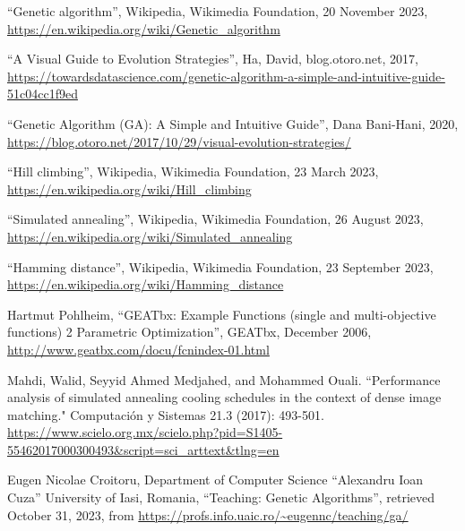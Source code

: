 \documentclass{article}
\begin{document}
\begin{thebibliography}{9}

``Genetic algorithm'', Wikipedia, Wikimedia Foundation, 20 November 2023, \url{https://en.wikipedia.org/wiki/Genetic_algorithm}

``A Visual Guide to Evolution Strategies'', Ha, David, blog.otoro.net, 2017, \url{https://towardsdatascience.com/genetic-algorithm-a-simple-and-intuitive-guide-51c04cc1f9ed}

``Genetic Algorithm (GA): A Simple and Intuitive Guide'', Dana Bani-Hani, 2020, \url{https://blog.otoro.net/2017/10/29/visual-evolution-strategies/}

``Hill climbing'', Wikipedia, Wikimedia Foundation, 23 March 2023, \url{https://en.wikipedia.org/wiki/Hill\_climbing}

``Simulated annealing'', Wikipedia, Wikimedia Foundation, 26 August 2023, \url{https://en.wikipedia.org/wiki/Simulated\_annealing}

``Hamming distance'', Wikipedia, Wikimedia Foundation, 23 September 2023, \url{https://en.wikipedia.org/wiki/Hamming\_distance}

Hartmut Pohlheim, ``GEATbx: Example Functions (single and multi-objective functions) 2 Parametric Optimization'', GEATbx, December 2006, \url{http://www.geatbx.com/docu/fcnindex-01.html}

Mahdi, Walid, Seyyid Ahmed Medjahed, and Mohammed Ouali. ``Performance analysis of simulated annealing cooling schedules in the context of dense image matching." Computación y Sistemas 21.3 (2017): 493-501. \url{https://www.scielo.org.mx/scielo.php?pid=S1405-55462017000300493&script=sci_arttext&tlng=en}

Eugen Nicolae Croitoru, Department of Computer Science ``Alexandru Ioan Cuza'' University of Iasi, Romania, ``Teaching: Genetic Algorithms'', retrieved October 31, 2023, from \url{https://profs.info.uaic.ro/~eugennc/teaching/ga/}

\end{thebibliography}
\end{document}
